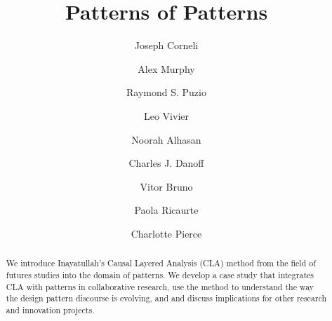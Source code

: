 \title{Patterns of Patterns}

\author{Joseph Corneli}
\author{Alex Murphy}

\author{Raymond S. Puzio}
\authornotemark[1]
\author{Leo Vivier}

\author{Noorah Alhasan}

\author{Charles J. Danoff}

\author{Vitor Bruno}

\author{Paola Ricaurte}

\author{Charlotte Pierce}

\renewcommand{\shortauthors}{Corneli et al.}

\begin{abstract}
  We introduce Inayatullah's Causal Layered Analysis (CLA) method from
  the field of futures studies into the domain of patterns.  We
  develop a case study that integrates CLA with patterns in
  collaborative research, use the method to understand the way the
  design pattern discourse is evolving, and and discuss implications
  for other research and innovation projects.
\end{abstract}

